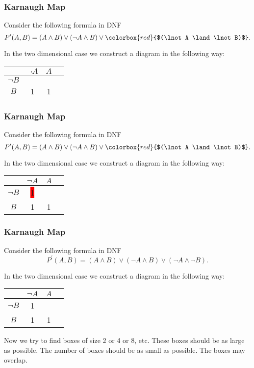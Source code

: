 \documentclass{beamer}
\theoremstyle{remark}
\begin{document}
\begin{frame}
	\frametitle{Karnaugh Map}
	Consider the following formula in DNF
	\[ P^{\prime}(A, B) = (A \land B) \lor (\lnot A \land B) \lor \colorbox{red}{$(\lnot A \land \lnot B)$}.\]
	
	In the two dimensional case we construct a diagram in the following way:
	
	\vspace{1.5em}
	
	\begin{center}
	\begin{tabular}{c|c|c|c}
		& $\lnot A$ & $A$ \\ \hline
		$\lnot B$ & &  \\ \hline
		$B$ & 1 &  1\\ \hline
	\end{tabular}
	\end{center}
\end{frame}

\begin{frame}
	\frametitle{Karnaugh Map}
	Consider the following formula in DNF
	\[ P^{\prime}(A, B) = (A \land B) \lor (\lnot A \land B) \lor \colorbox{red}{$(\lnot A \land \lnot B)$}.\]
	
	In the two dimensional case we construct a diagram in the following way:
	
	\vspace{1.5em}
	
	\begin{center}
	\begin{tabular}{c|c|c|c}
		& $\lnot A$ & $A$ \\ \hline
		$\lnot B$ & \colorbox{red}{1} &  \\ \hline
		$B$ & 1 &  1\\ \hline
	\end{tabular}
	\end{center}
\end{frame}

\begin{frame}
	\frametitle{Karnaugh Map}
	Consider the following formula in DNF
	\[ P^{\prime}(A, B) = (A \land B) \lor (\lnot A \land B) \lor (\lnot A \land \lnot B).\]
	
	In the two dimensional case we construct a diagram in the following way:
	
	\vspace{1.5em}
	
	\begin{center}
	\begin{tabular}{c|c|c|c}
		& $\lnot A$ & $A$ \\ \hline
		$\lnot B$ & 1 &  \\ \hline
		$B$ & 1 &  1\\ \hline
	\end{tabular}
	\end{center}
	
	Now we try to find boxes of size 2 or 4 or 8, etc. These boxes should be as large as possible. The number of boxes should be as small as possible. The boxes may overlap.
\end{frame}
\end{document}
